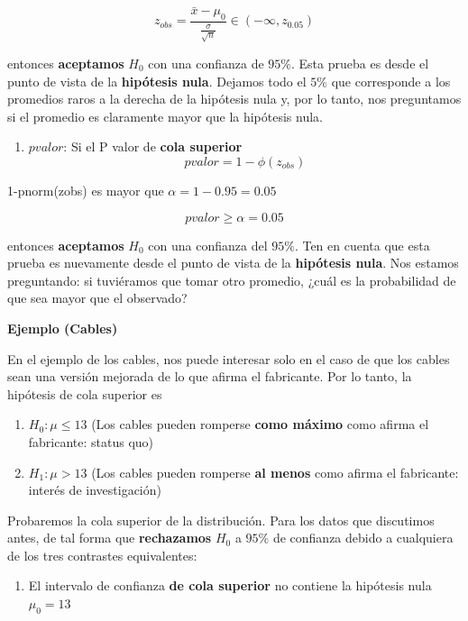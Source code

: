 \documentclass[
]{book}
\providecommand{\tightlist}{%
  \setlength{\itemsep}{0pt}\setlength{\parskip}{0pt}}
\begin{document}
\[z_{obs}=\frac{\bar{x}-\mu_0}{\frac{\sigma}{\sqrt{n}}} \in (-\infty, z_{0.05})\]

entonces \textbf{aceptamos} \(H_0\) con una confianza de \(95\%\). Esta prueba es desde el punto de vista de la \textbf{hipótesis nula}. Dejamos todo el \(5\%\) que corresponde a los promedios raros a la derecha de la hipótesis nula y, por lo tanto, nos preguntamos si el promedio es claramente mayor que la hipótesis nula.

\begin{enumerate}
\def\labelenumi{\arabic{enumi}.}
\setcounter{enumi}{2}
\tightlist
\item
  \(pvalor\): Si el P valor de \textbf{cola superior} \[pvalor= 1-\phi(z_{obs})\]
\end{enumerate}

1-pnorm(zobs) es mayor que \(\alpha=1-0.95=0.05\)

\[pvalor \geq \alpha =0.05\]

entonces \textbf{aceptamos} \(H_0\) con una confianza del \(95\%\). Ten en cuenta que esta prueba es nuevamente desde el punto de vista de la \textbf{hipótesis nula}. Nos estamos preguntando: si tuviéramos que tomar otro promedio, ¿cuál es la probabilidad de que sea mayor que el observado?

\textbf{Ejemplo (Cables)}

En el ejemplo de los cables, nos puede interesar solo en el caso de que los cables sean una versión mejorada de lo que afirma el fabricante. Por lo tanto, la hipótesis de cola superior es

\begin{enumerate}
\def\labelenumi{\alph{enumi}.}
\tightlist
\item
  \(H_0:\mu \leq 13\) (Los cables pueden romperse \textbf{como máximo} como afirma el fabricante: status quo)
\item
  \(H_1:\mu > 13\) (Los cables pueden romperse \textbf{al menos} como afirma el fabricante: interés de investigación)
\end{enumerate}

Probaremos la cola superior de la distribución.
Para los datos que discutimos antes, de tal forma que \textbf{rechazamos} \(H_0\) a \(95\%\) de confianza debido a cualquiera de los tres contrastes equivalentes:

\begin{enumerate}
\def\labelenumi{\arabic{enumi}.}
\tightlist
\item
  El intervalo de confianza \textbf{de cola superior} no contiene la hipótesis nula \(\mu_0=13\)
\end{enumerate}
\end{document}
